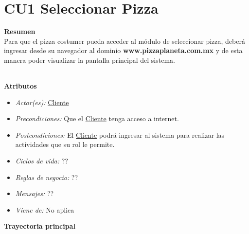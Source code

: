 
\pagebreak
\hypertarget{CU1}{}
\section{CU1 Seleccionar Pizza}

	\noindent \textbf{Resumen}\\

		Para que el pizza costumer pueda acceder al módulo de seleccionar pizza, deberá ingresar desde su navegador al dominio {\textbf{www.pizzaplaneta.com.mx}} y de esta manera poder visualizar la pantalla principal del sistema.

	\noindent \textbf{\\Atributos}

		\begin{itemize}

			\item \textit{Actor(es):} \hyperlink{A:Cliente}{Cliente}
			\item \textit{Precondiciones:} Que el \hyperlink{A:Cliente}{Cliente} tenga acceso a internet. 
			\item \textit{Postcondiciones:} El \hyperlink{A:Cliente}{Cliente} podrá ingresar al sistema para realizar las actividades que su rol le permite.
			\item \textit{Ciclos de vida:} ??
			\item \textit{Reglas de negocio:} ??
			\item \textit{Mensajes:} ??
			\item \textit{Viene de:} No aplica

		\end{itemize} 

	\noindent \textbf{Trayectoria principal}

